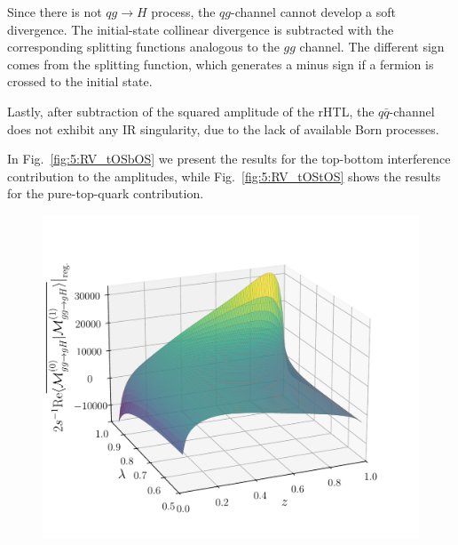 Since there is not $ q g \rightarrow H$ process, the $q g$-channel cannot develop a soft divergence. The initial-state collinear divergence is subtracted with the corresponding splitting functions analogous to the $gg$ channel. The different sign comes from the splitting function, which generates a minus sign if a fermion is crossed to the initial state.

Lastly, after subtraction of the squared amplitude of the \acs{rHTL}, the $q \bar{q}$-channel does not exhibit any \acs{IR} singularity, due to the lack of available Born processes.

In Fig.~\ref{fig:5:RV_tOSbOS} we present the results for the top-bottom interference contribution to the amplitudes, while Fig.~\ref{fig:5:RV_tOStOS} shows the results for the pure-top-quark contribution.
\begin{figure}[ht]
  \begin{minipage}[t]{0.49\textwidth}
  \centering
  \includegraphics[width=\textwidth]{Images/RV_amplitudes/tOSbOS_gg.pdf}
  \end{minipage}
  \begin{minipage}[t]{0.49\textwidth}
  \centering

\end{minipage}
\end{figure}
